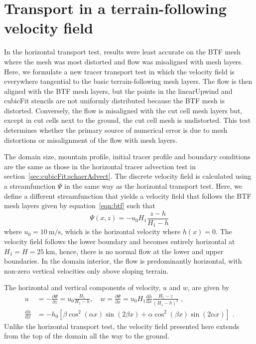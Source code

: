 \section{Transport in a terrain-following velocity field}
\label{sec:cubicFit:tfAdvect}

In the horizontal transport test, results were least accurate on the BTF mesh where the mesh was most distorted and flow was misaligned with mesh layers.
Here, we formulate a new tracer transport test in which the velocity field is everywhere tangential to the basic terrain-following mesh layers.
The flow is then aligned with the BTF mesh layers, but the points in the linearUpwind and cubicFit stencils are not uniformly distributed because the BTF mesh is distorted.
Conversely, the flow is misaligned with the cut cell mesh layers but, except in cut cells next to the ground, the cut cell mesh is undistorted.
This test determines whether the primary source of numerical error is due to mesh distortions or misalignment of the flow with mesh layers.

The domain size, mountain profile, initial tracer profile and boundary conditions are the same as those in the horizontal tracer advection test in section~\ref{sec:cubicFit:schaerAdvect}.
The discrete velocity field is calculated using a streamfunction $\Psi$ in the same way as the horizontal transport test.
Here, we define a different streamfunction that yields a velocity field that follows the BTF mesh layers given by equation~\eqref{eqn:btf} such that
\begin{equation}
	\Psi(x,z) = -u_0 H_1 \frac{z - h}{H_1 - h} \label{eqn:streamfunc-btf}
\end{equation}
where $u_0 = \SI{10}{\meter\per\second}$, which is the horizontal velocity where $h(x) = 0$.
The velocity field follows the lower boundary and becomes entirely horizontal at $H_1 = H = \SI{25}{\kilo\meter}$, hence, there is no normal flow at the lower and upper boundaries.
In the domain interior, the flow is predominantly horizontal, with non-zero vertical velocities only above sloping terrain.

The horizontal and vertical components of velocity, $u$ and $w$, are given by
\begin{align}
	u &= -\frac{\partial \Psi}{\partial z} = u_0 \frac{H_1}{H_1 - h}, \quad w = \frac{\partial \Psi}{\partial x} = u_0 H_1 \frac{\mathrm{d} h}{\mathrm{d} x} \frac{H_1 - z}{\left( H_1 - h \right)^2} \label{eqn:slanted:uw-btf} \text{ ,}\\
	\frac{\mathrm{d} h}{\mathrm{d} x} &= - h_0 \left[ 
		\beta \cos^2 \left( \alpha x \right) \sin \left( 2 \beta x \right) +
		\alpha \cos^2 \left( \beta x \right) \sin \left( 2 \alpha x \right)
	\right] \text{ .}
\end{align}
Unlike the horizontal transport test, the velocity field presented here extends from the top of the domain all the way to the ground.

